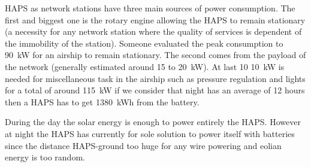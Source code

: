 HAPS as network stations have three main sources of power consumption. The first and biggest one is the rotary engine allowing the HAPS to remain stationary (a necessity for any network station where the quality of services is dependent of the immobility of the station). Someone evaluated the peak consumption to \SI{90}{kW} for  an airship to remain stationary. The second comes from the payload of the network (generally estimated around 15 to \SI{20}{kW}). At last 10 \SI{10}{kW} is needed for miscellaneous task in the airship such as pressure regulation and lights for a total of around \SI{115}{kW} if we consider that night has an average of 12 hours then a HAPS has to get \SI{1380}{kWh} from the battery.

During the day the solar energy is enough to power entirely the HAPS. However at night the HAPS has currently for sole solution to power itself with batteries since the distance HAPS-ground too huge for any wire powering and eolian energy is too random.